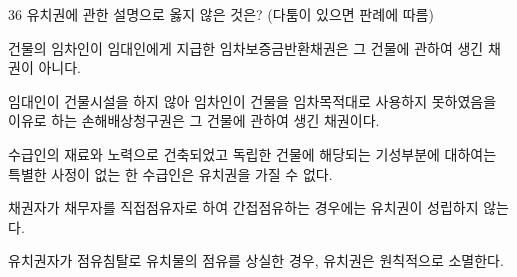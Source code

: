 \begin{question}{36}
유치권에 관한 설명으로 옳지 않은 것은? (다툼이 있으면 판례에 따름)
\begin{choices}
  \item 건물의 임차인이 임대인에게 지급한 임차보증금반환채권은 그 건물에 관하여 생긴 채권이 아니다.
  \item 임대인이 건물시설을 하지 않아 임차인이 건물을 임차목적대로 사용하지 못하였음을 이유로 하는 손해배상청구권은 그 건물에 관하여 생긴 채권이다.
  \item 수급인의 재료와 노력으로 건축되었고 독립한 건물에 해당되는 기성부분에 대하여는 특별한 사정이 없는 한 수급인은 유치권을 가질 수 없다.
  \item 채권자가 채무자를 직접점유자로 하여 간접점유하는 경우에는 유치권이 성립하지 않는다.
  \item 유치권자가 점유침탈로 유치물의 점유를 상실한 경우, 유치권은 원칙적으로 소멸한다.
\end{choices}
\end{question}
